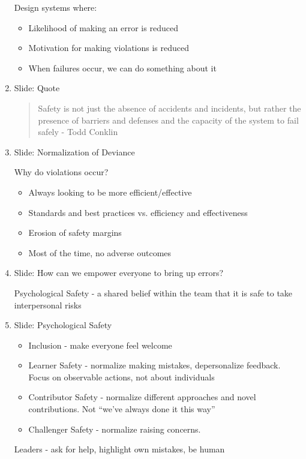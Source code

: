 \documentclass[]{article}
\begin{document}
\begin{enumerate}
    Design systems where:
    \begin{itemize}
        \item Likelihood of making an error is reduced
        \item Motivation for making violations is reduced
        \item When failures occur, we can do something about it
    \end{itemize}

    \item Slide: Quote
    \begin{quote}
        Safety is not just the absence of accidents and incidents, but rather the presence of barriers and defenses and the capacity of the system to fail safely - Todd Conklin
    \end{quote}
    \item Slide: Normalization of Deviance

    Why do violations occur?
    \begin{itemize}
        \item Always looking to be more efficient/effective
        \item Standards and best practices vs. efficiency and effectiveness
        \item Erosion of safety margins
        \item Most of the time, no adverse outcomes
    \end{itemize}

    \item Slide: How can we empower everyone to bring up errors?

    Psychological Safety - a shared belief within the team that it is safe to take interpersonal risks

    \item Slide: Psychological Safety
    \begin{itemize}
        \item Inclusion - make everyone feel welcome
        \item Learner Safety - normalize making mistakes, depersonalize feedback.  Focus on observable actions, not about individuals
        \item Contributor Safety - normalize different approaches and novel contributions.  Not ``we've always done it this way''
        \item Challenger Safety - normalize raising concerns.
        
    \end{itemize}
    Leaders - ask for help, highlight own mistakes, be human


\end{enumerate}
\end{document}
